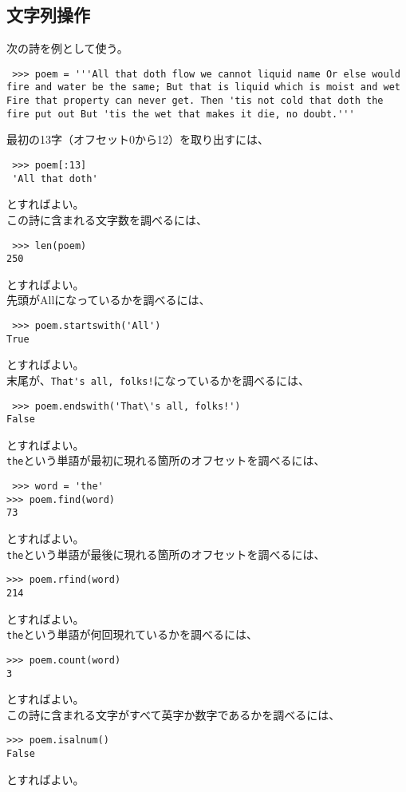 \documentclass[11pt, oneside]{article}   	%
\begin{document}
  \subsection{文字列操作}
  次の詩を例として使う。
   \begin{lstlisting}
 >>> poem = '''All that doth flow we cannot liquid name Or else would fire and water be the same; But that is liquid which is moist and wet Fire that property can never get. Then 'tis not cold that doth the fire put out But 'tis the wet that makes it die, no doubt.'''
   \end{lstlisting}
  最初の13字（オフセット0から12）を取り出すには、
 \begin{lstlisting}
 >>> poem[:13]
 'All that doth'
 \end{lstlisting}
 とすればよい。\\
 この詩に含まれる文字数を調べるには、
 \begin{lstlisting}
 >>> len(poem)
250
 \end{lstlisting}
 とすればよい。\\
先頭がAllになっているかを調べるには、
\begin{lstlisting}
 >>> poem.startswith('All')
True
 \end{lstlisting}
  とすればよい。\\
末尾が、\verb|That's all, folks!|になっているかを調べるには、
\begin{lstlisting}
 >>> poem.endswith('That\'s all, folks!')
False
 \end{lstlisting}
  とすればよい。\\
  \verb|the|という単語が最初に現れる箇所のオフセットを調べるには、
  \begin{lstlisting}
 >>> word = 'the'
>>> poem.find(word)
73
 \end{lstlisting}
  とすればよい。\\
   \verb|the|という単語が最後に現れる箇所のオフセットを調べるには、
  \begin{lstlisting}
>>> poem.rfind(word)
214
 \end{lstlisting}
  とすればよい。\\
     \verb|the|という単語が何回現れているかを調べるには、
  \begin{lstlisting}
>>> poem.count(word)
3
 \end{lstlisting}
  とすればよい。\\
  この詩に含まれる文字がすべて英字か数字であるかを調べるには、
    \begin{lstlisting}
>>> poem.isalnum()
False
 \end{lstlisting}
  とすればよい。\\
  
\end{document}
